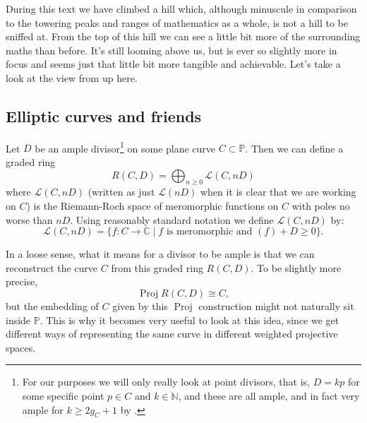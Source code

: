 \documentclass[10pt,notitlepage]{article}
\numberwithin{equation}{subsection}
\DeclareMathOperator{\proj}{Proj}
\newcommand{\pee}{\mathbb{P}}
\newcommand{\cc}{\mathbb{C}}
\begin{document}
    During this text we have climbed a hill which, although minuscule in comparison to the towering peaks and ranges of mathematics as a whole, is not a hill to be sniffed at.
    From the top of this hill we can see a little bit more of the surrounding maths than before.
    It's still looming above us, but is ever so slightly more in focus and seems just that little bit more tangible and achievable.
    Let's take a look at the view from up here.

    \subsection{Elliptic curves and friends} %
    \label{sub:elliptic_curves_and_friends}

        Let $D$ be an ample divisor\footnote{%
            For our purposes we will only really look at point divisors, that is, $D=kp$ for some specific point $p\in C$ and $k\in\mathbb{N}$, and these are all ample, and in fact very ample for $k\geqslant2g_C+1$ by \cite[Chapter~IV,~Corollary~3.2(b)]{Hartshorne:1977we}.
        } on some plane curve $C\subset\pee$.
        Then we can define a graded ring
        \[
            R(C,D) = \bigoplus_{n\geqslant0}\mathcal{L}(C,nD)
        \]
        where $\mathcal{L}(C,nD)$ (written as just $\mathcal{L}(nD)$ when it is clear that we are working on $C$) is the Riemann-Roch space of meromorphic functions on $C$ with poles no worse than $nD$.
        Using reasonably standard notation we define $\mathcal{L}(C,nD)$ by:
        \[
            \mathcal{L}(C,nD) = \{f\colon C\to\cc \mid f\text{ is meromorphic and }(f)+D\geqslant0\}.
        \]

        In a loose sense, what it means for a divisor to be ample is that we can reconstruct the curve $C$ from this graded ring $R(C,D)$.
        To be slightly more precise,
        \[
            \proj R(C,D)\cong C,
        \]
        but the embedding of $C$ given by this $\proj$ construction might not naturally sit inside $\pee$.
        This is why it becomes very useful to look at this idea, since we get different ways of representing the same curve in different weighted projective spaces.
\end{document}
